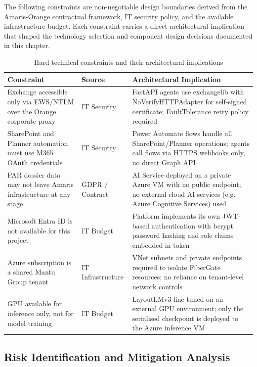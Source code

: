 The following constraints are non-negotiable design boundaries derived from the Amaris-Orange contractual framework, IT security policy, and the available infrastructure budget. Each constraint carries a direct architectural implication that shaped the technology selection and component design decisions documented in this chapter.

\begin{table}[H]
  \centering
  \caption{Hard technical constraints and their architectural implications}
  \renewcommand{\arraystretch}{1.0}
  \begin{tabularx}{\textwidth}{|X|X|X|}
    \hline
    \textbf{Constraint} & \textbf{Source} & \textbf{Architectural Implication} \\ \hline
    Exchange accessible only via EWS/NTLM over the Orange corporate proxy & IT Security & FastAPI agents use exchangelib with NoVerifyHTTPAdapter for self-signed certificate; FaultTolerance retry policy required \\ \hline
    SharePoint and Planner automation must use M365 OAuth credentials & IT Security & Power Automate flows handle all SharePoint/Planner operations; agents call flows via HTTPS webhooks only, no direct Graph API \\ \hline
    PAR dossier data may not leave Amaris infrastructure at any stage & GDPR / Contract & AI Service deployed on a private Azure VM with no public endpoint; no external cloud AI services (e.g. Azure Cognitive Services) used \\ \hline
    Microsoft Entra ID is not available for this project & IT Budget & Platform implements its own JWT-based authentication with bcrypt password hashing and role claims embedded in token \\ \hline
    Azure subscription is a shared Mantu Group tenant & IT Infrastructure & VNet subnets and private endpoints required to isolate FiberGate resources; no reliance on tenant-level network controls \\ \hline
    GPU available for inference only, not for model training & IT Budget & LayoutLMv3 fine-tuned on an external GPU environment; only the serialised checkpoint is deployed to the Azure inference VM \\ \hline
  \end{tabularx}
\end{table}

\subsection{Risk Identification and Mitigation Analysis}

